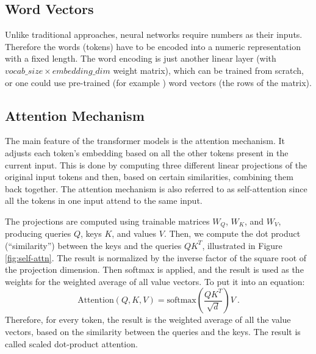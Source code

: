 
\subsection{Word Vectors}

Unlike traditional approaches, neural networks require numbers as their inputs.
Therefore the words (tokens) have to be encoded into a numeric representation with a fixed length.
The word encoding is just another linear layer (with $vocab\_size \times embedding\_dim$ weight matrix), which can be trained from scratch, or one could use pre-trained (for example \citep{glove}) word vectors (the rows of the matrix).

\subsection{Attention Mechanism}
\label{subsec:attention}

The main feature of the transformer models is the attention mechanism. It adjusts each token's embedding based on all the other tokens present in the current input.
This is done by computing three different linear projections of the original input tokens and then, based on certain similarities, combining them back together. 
The attention mechanism is also referred to as self-attention since all the tokens in one input attend to the same input.

The projections are computed using trainable matrices $W_Q$, $W_K$, and $W_V$, producing queries $Q$, keys $K$, and values $V$. Then, we compute the dot product (``similarity'') between the keys and the queries $QK^T$, illustrated in Figure \ref{fig:self-attn}.
The result is normalized by the inverse factor of the square root of the projection dimension. 
Then softmax is applied, and the result is used as the weights for the weighted average of all value vectors. To put it into an equation: 
\begin{equation}
  \text{Attention}(Q,K,V) = \text{softmax}\left(\frac{QK^T}{\sqrt{d}}\right)V\ .
  \label{eq:attention}
\end{equation}
Therefore, for every token, the result is the weighted average of all the value vectors, based on the similarity between the queries and the keys. 
The result is called scaled dot-product attention.

